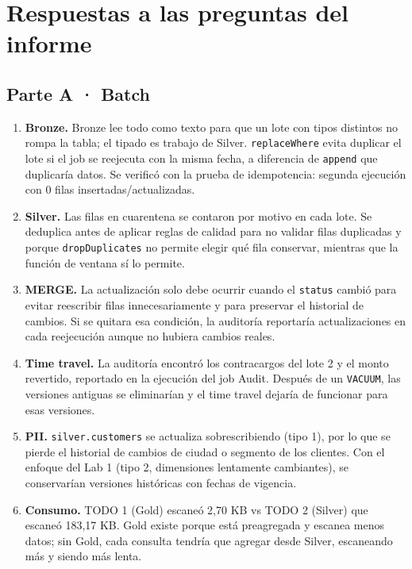 ﻿\documentclass[11pt,a4paper]{article}
\begin{document}
\section{Respuestas a las preguntas del informe}

\subsection{Parte A · Batch}

\begin{enumerate}[label=Q\arabic*., leftmargin=*]
  \item \textbf{Bronze.} Bronze lee todo como texto para que un lote con tipos distintos no rompa la tabla; el tipado es trabajo de Silver. \texttt{replaceWhere} evita duplicar el lote si el job se reejecuta con la misma fecha, a diferencia de \texttt{append} que duplicaría datos. Se verificó con la prueba de idempotencia: segunda ejecución con 0 filas insertadas/actualizadas.
  
  \item \textbf{Silver.} Las filas en cuarentena se contaron por motivo en cada lote. Se deduplica antes de aplicar reglas de calidad para no validar filas duplicadas y porque \texttt{dropDuplicates} no permite elegir qué fila conservar, mientras que la función de ventana sí lo permite.
  
  \item \textbf{MERGE.} La actualización solo debe ocurrir cuando el \texttt{status} cambió para evitar reescribir filas innecesariamente y para preservar el historial de cambios. Si se quitara esa condición, la auditoría reportaría actualizaciones en cada reejecución aunque no hubiera cambios reales.
  
  \item \textbf{Time travel.} La auditoría encontró los contracargos del lote 2 y el monto revertido, reportado en la ejecución del job Audit. Después de un \texttt{VACUUM}, las versiones antiguas se eliminarían y el time travel dejaría de funcionar para esas versiones.
  
  \item \textbf{PII.} \texttt{silver.customers} se actualiza sobrescribiendo (tipo 1), por lo que se pierde el historial de cambios de ciudad o segmento de los clientes. Con el enfoque del Lab 1 (tipo 2, dimensiones lentamente cambiantes), se conservarían versiones históricas con fechas de vigencia.
  
  \item \textbf{Consumo.} TODO 1 (Gold) escaneó 2,70 KB vs TODO 2 (Silver) que escaneó 183,17 KB. Gold existe porque está preagregada y escanea menos datos; sin Gold, cada consulta tendría que agregar desde Silver, escaneando más y siendo más lenta.
\end{enumerate}
\end{document}
